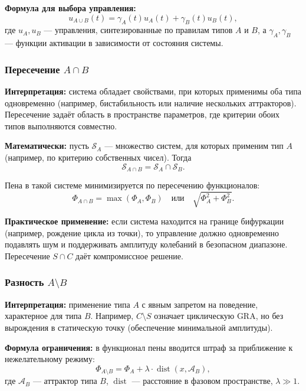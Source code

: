 \documentclass[12pt,a4paper]{article}
\DeclareMathOperator{\dist}{dist}
\begin{document}
\textbf{Формула для выбора управления:}
\begin{equation}
    u_{A \cup B}(t) = \gamma_A(t) u_A(t) + \gamma_B(t) u_B(t),
\end{equation}
где $u_A, u_B$ — управления, синтезированные по правилам типов $A$ и $B$, а $\gamma_A, \gamma_B$ — функции активации в зависимости от состояния системы.

\subsubsection{Пересечение $A \cap B$}

\textbf{Интерпретация:} система обладает свойствами, при которых применимы оба типа одновременно (например, бистабильность или наличие нескольких аттракторов). Пересечение задаёт область в пространстве параметров, где критерии обоих типов выполняются совместно.

\textbf{Математически:} пусть $\mathcal{S}_A$ — множество систем, для которых применим тип $A$ (например, по критерию собственных чисел). Тогда
\begin{equation}
    \mathcal{S}_{A \cap B} = \mathcal{S}_A \cap \mathcal{S}_B.
\end{equation}

Пена в такой системе минимизируется по пересечению функционалов:
\begin{equation}
    \Phi_{A \cap B} = \max(\Phi_A, \Phi_B) \quad \text{или} \quad \sqrt{\Phi_A^2 + \Phi_B^2}.
\end{equation}

\textbf{Практическое применение:} если система находится на границе бифуркации (например, рождение цикла из точки), то управление должно одновременно подавлять шум и поддерживать амплитуду колебаний в безопасном диапазоне. Пересечение $S \cap C$ даёт компромиссное решение.

\subsubsection{Разность $A \setminus B$}

\textbf{Интерпретация:} применение типа $A$ с явным запретом на поведение, характерное для типа $B$. Например, $C \setminus S$ означает циклическую GRA, но без вырождения в статическую точку (обеспечение минимальной амплитуды).

\textbf{Формула ограничения:} в функционал пены вводится штраф за приближение к нежелательному режиму:
\begin{equation}
    \Phi_{A \setminus B} = \Phi_A + \lambda \cdot \dist(x, \mathcal{A}_B),
\end{equation}
где $\mathcal{A}_B$ — аттрактор типа $B$, $\dist$ — расстояние в фазовом пространстве, $\lambda \gg 1$.
\end{document}
